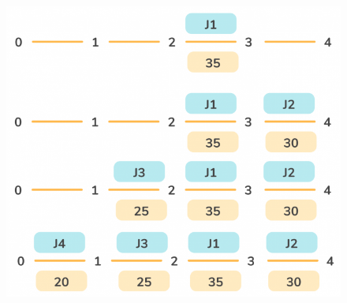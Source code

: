 \documentclass[a4paper,11pt]{book}
\begin{document}
\begin{figure}[ht]
	\centering
	\includegraphics[scale=0.35]{code/sort/pic/job2.png}
\end{figure}
\end{document}
